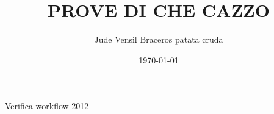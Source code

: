 \documentclass{article}
\title{PROVE DI CHE CAZZO}
\author{Jude Vensil Braceros patata cruda}
\date{\today}
\begin{document}
\maketitle

Verifica workflow 2012
\end{document}
